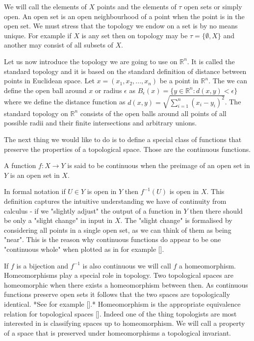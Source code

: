 We will call the elements of $X$ points and the elements of $\tau$ open sets or simply open. An open set is an open neighbourhood of a point when the point is in the open set. We must stress that the topology we endow on a set is by no means unique. For example if $X$ is any set then on topology may be $\tau = \{\emptyset, X\}$ and another may consist of all subsets of $X$. 

Let us now introduce the topology we are going to use on $\mathbb{R}^n$. It is called the standard topology and it is based on the standard definition of distance between points in Euclidean space. Let $x = (x_1, x_2, ..., x_n)$ be a point in $\mathbb{R}^n$. The we can define the open ball around $x$ or radius $\epsilon$ as $B_\epsilon(x) = \{y \in \mathbb{R}^n: d(x, y) < \epsilon\}$ where we define the distance function as $d(x, y) = \sqrt{\sum_{i=1}^n{(x_i - y_i)^2}}$. The standard topology on $\mathbb{R}^n$ consists of the open balls around all points of all possible radii and their finite intersections and arbitrary unions.

The next thing we would like to do is to define a special class of functions that preserve the properties of a topological space. Those are the continuous functions.

\begin{defn} A function $f : X \to Y$ is said to be continuous when the preimage of an open set in $Y$ is an open set in $X$. \end{defn}

In formal notation if $U \in Y$ is open in $Y$ then $f^{-1}(U)$ is open in $X$. This definition captures the intuitive understanding we have of continuity from calculus - if we "slightly adjust" the output of a function in $Y$ then there should be only a "slight change" in input in $X$. The "slight change" is formalised by considering all points in a single open set, as we can think of them as being "near". This is the reason why continuous functions do appear to be one "continuous whole" when plotted as in for example []. 
    

If $f$ is a bijection and $f^{-1}$ is also continuous we will call $f$ a homeomorphism. Homeomorphisms play a special role in topology. Two topological spaces are homeomorphic when there exists a homeomorphism between then. As continuous functions preserve open sets it follows that the two spaces are topologically identical. *See for example [].* Homeomorphism is the appropriate equivalence relation for topological spaces []. Indeed one of the thing topologists are most interested in is classifying spaces up to homeomorphism. We will call a property of a space that is preserved under homeomorphisms a topological invariant.

